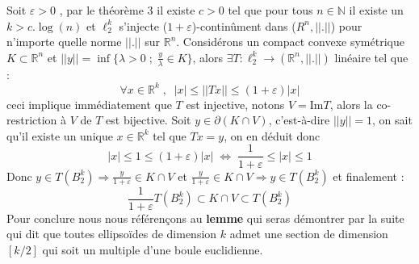 \documentclass[12pt]{article}
\theoremstyle{definition}
\begin{document}
Soit $\varepsilon>0$ , par le théorème 3 il existe $c>0$ tel que pour tous $n\in\mathbb{N}$ il existe un $k>c.\log(n)$ et $\ell_2^k$ s'injecte ($1+\varepsilon$)-continûment dans ($R^n,||.||$) pour n’importe quelle norme $||.||$ sur $\mathbb{R}^n$. Considérons un compact convexe symétrique $K\subset \mathbb{R}^n$ et $||y||=\inf\Big\{\lambda>0\; ;\; \frac{y}{\lambda}\in K\Big\}$, alors $\exists T :\ell^{k}_2\to(\mathbb{R}^n,||.||)$ linéaire tel que :
\begin{equation*}
\forall x \in \mathbb{R}^k \; , \;\; |x|\leq ||Tx||\leq (1+\varepsilon)|x|
\end{equation*}
ceci implique immédiatement que $T$ est injective, notons $V=\text{Im}T$, alors la co-restriction à $V$ de $T$ est bijective.
Soit $y\in \partial(K\cap V)$, c'est-à-dire $||y||=1$, on sait qu'il existe un unique $x\in\mathbb{R}^k$ tel que $Tx=y$, on en déduit donc 
\begin{equation*}
|x|\leq 1 \leq (1+\varepsilon)|x|\; \iff\; \frac{1}{1+\varepsilon}\leq|x|\leq 1
\end{equation*}
Donc $y\in T(B_2^k)\Rightarrow \frac{y}{1+\varepsilon}\in K\cap V$ et $\frac{y}{1+\varepsilon}\in K\cap V\Rightarrow y\in T(B_2^k)$ et finalement :
\begin{equation*}
	\frac{1}{1+\varepsilon}T(B_2^k)\subset K\cap V \subset T(B_2^k)
\end{equation*}
Pour conclure nous nous référençons au \textbf{lemme } qui seras démontrer par la suite qui dit que toutes ellipsoïdes de dimension $k$ admet une section de dimension $[k/2]$ qui soit un multiple d'une boule euclidienne. 

\newtheorem{lemme}[lemme]{Lemme}

\newtheorem{rem}[rem]{Remarque}

\newtheorem{proposition}[proposition]{Proposition}

\newtheorem{cor}[cor]{Corollaire}
\end{document}
